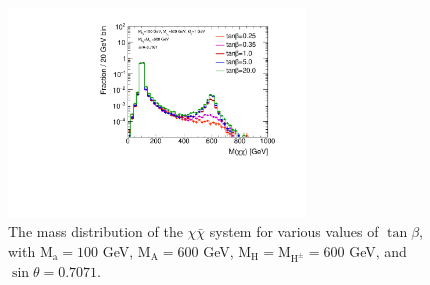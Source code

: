 \begin{figure}
  \centering
  \includegraphics[width=0.7\textwidth]{texinputs/04_grid/figures/DMHF/benchmarking/MDM_1_Ma_100_MA_600_sinp_0.7071_SCAN_tanb_decayed/mchichi.pdf}
  \caption{The mass distribution of the $\chi \bar{\chi}$ system for various values of $\tan\beta$, with $\mathrm{M_a}=100$ GeV, $\mathrm{M_A}=600$ GeV, $\mathrm{M_H}=\mathrm{M_{H^{\pm}}}=600$ GeV, and $\sin\theta=0.7071$.}
  \label{fig:mchichi_tanB}
\end{figure}

